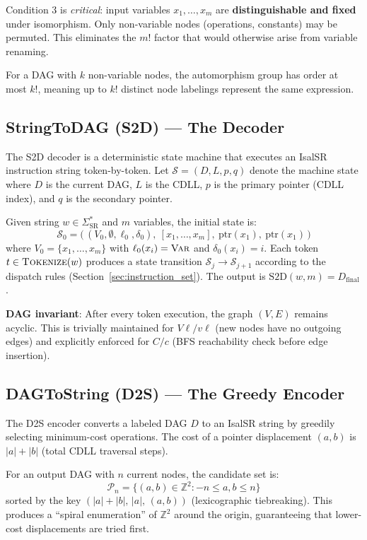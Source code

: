 Condition 3 is \emph{critical}: input variables $x_1, \ldots, x_m$ are
\textbf{distinguishable and fixed} under isomorphism. Only non-variable nodes
(operations, constants) may be permuted. This eliminates the $m!$ factor that
would otherwise arise from variable renaming.

For a DAG with $k$ non-variable nodes, the automorphism group has order at most $k!$,
meaning up to $k!$ distinct node labelings represent the same expression.

\subsection{StringToDAG (S2D) --- The Decoder}

The S2D decoder is a deterministic state machine that executes an IsalSR instruction
string token-by-token. Let $\mathcal{S} = (D, L, p, q)$ denote the machine state where
$D$ is the current DAG, $L$ is the CDLL, $p$ is the primary pointer (CDLL index),
and $q$ is the secondary pointer.

\begin{definition}[S2D Execution]
Given string $w \in \Sigma_{\mathrm{SR}}^*$ and $m$ variables, the initial state is:
\[
  \mathcal{S}_0 = \big(\, (V_0, \emptyset, \ell_0, \delta_0),\ [x_1, \ldots, x_m],\ \text{ptr}(x_1),\ \text{ptr}(x_1) \,\big)
\]
where $V_0 = \{x_1, \ldots, x_m\}$ with $\ell_0(x_i) = \textsc{Var}$ and $\delta_0(x_i) = i$.
Each token $t \in \textsc{Tokenize}(w)$ produces a state transition $\mathcal{S}_j \to \mathcal{S}_{j+1}$
according to the dispatch rules (Section~\ref{sec:instruction_set}).
The output is $\text{S2D}(w, m) = D_{\text{final}}$.
\end{definition}

\textbf{DAG invariant}: After every token execution, the graph $(V, E)$ remains acyclic.
This is trivially maintained for $V\ell/v\ell$ (new nodes have no outgoing edges)
and explicitly enforced for $C/c$ (BFS reachability check before edge insertion).

\subsection{DAGToString (D2S) --- The Greedy Encoder}

The D2S encoder converts a labeled DAG $D$ to an IsalSR string by greedily
selecting minimum-cost operations. The cost of a pointer displacement $(a, b)$
is $|a| + |b|$ (total CDLL traversal steps).

\begin{definition}
For an output DAG with $n$ current nodes, the candidate set is:
\[
  \mathcal{P}_n = \{(a, b) \in \mathbb{Z}^2 : -n \leq a, b \leq n\}
\]
sorted by the key $(|a| + |b|,\, |a|,\, (a, b))$ (lexicographic tiebreaking).
This produces a ``spiral enumeration'' of $\mathbb{Z}^2$ around the origin,
guaranteeing that lower-cost displacements are tried first.
\end{definition}

